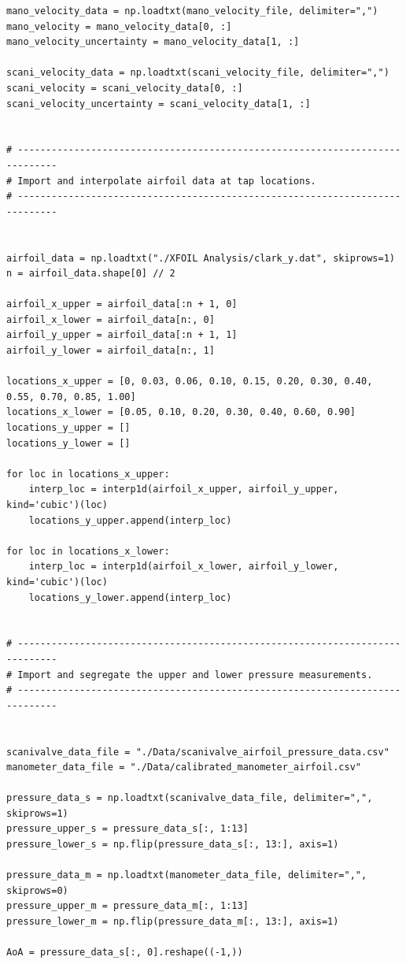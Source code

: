 \documentclass[runningheads]{llncs}
\begin{document}
\begin{verbatim}
mano_velocity_data = np.loadtxt(mano_velocity_file, delimiter=",")
mano_velocity = mano_velocity_data[0, :]
mano_velocity_uncertainty = mano_velocity_data[1, :]

scani_velocity_data = np.loadtxt(scani_velocity_file, delimiter=",")
scani_velocity = scani_velocity_data[0, :]
scani_velocity_uncertainty = scani_velocity_data[1, :]


# -----------------------------------------------------------------------------
# Import and interpolate airfoil data at tap locations.
# -----------------------------------------------------------------------------


airfoil_data = np.loadtxt("./XFOIL Analysis/clark_y.dat", skiprows=1)
n = airfoil_data.shape[0] // 2

airfoil_x_upper = airfoil_data[:n + 1, 0]
airfoil_x_lower = airfoil_data[n:, 0]
airfoil_y_upper = airfoil_data[:n + 1, 1]
airfoil_y_lower = airfoil_data[n:, 1]

locations_x_upper = [0, 0.03, 0.06, 0.10, 0.15, 0.20, 0.30, 0.40, 0.55, 0.70, 0.85, 1.00]
locations_x_lower = [0.05, 0.10, 0.20, 0.30, 0.40, 0.60, 0.90]
locations_y_upper = []
locations_y_lower = []

for loc in locations_x_upper:
    interp_loc = interp1d(airfoil_x_upper, airfoil_y_upper, kind='cubic')(loc)
    locations_y_upper.append(interp_loc)

for loc in locations_x_lower:
    interp_loc = interp1d(airfoil_x_lower, airfoil_y_lower, kind='cubic')(loc)
    locations_y_lower.append(interp_loc)


# -----------------------------------------------------------------------------
# Import and segregate the upper and lower pressure measurements.
# -----------------------------------------------------------------------------


scanivalve_data_file = "./Data/scanivalve_airfoil_pressure_data.csv"
manometer_data_file = "./Data/calibrated_manometer_airfoil.csv"

pressure_data_s = np.loadtxt(scanivalve_data_file, delimiter=",", skiprows=1)
pressure_upper_s = pressure_data_s[:, 1:13]
pressure_lower_s = np.flip(pressure_data_s[:, 13:], axis=1)

pressure_data_m = np.loadtxt(manometer_data_file, delimiter=",", skiprows=0)
pressure_upper_m = pressure_data_m[:, 1:13]
pressure_lower_m = np.flip(pressure_data_m[:, 13:], axis=1)

AoA = pressure_data_s[:, 0].reshape((-1,))



\end{verbatim}
\end{document}
